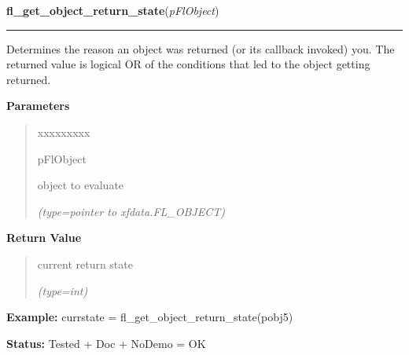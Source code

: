 \hspace{.8\funcindent}\begin{boxedminipage}{\funcwidth}

    \raggedright \textbf{fl\_get\_object\_return\_state}(\textit{pFlObject})

    \vspace{-1.5ex}

    \rule{\textwidth}{0.5\fboxrule}
\setlength{\parskip}{2ex}
    Determines the reason an object was returned (or its callback invoked) 
    you. The returned value is logical OR of the conditions that led to the
    object getting returned.

\setlength{\parskip}{1ex}
      \textbf{Parameters}
      \vspace{-1ex}

      \begin{quote}
        \begin{Ventry}{xxxxxxxxx}

          \item[pFlObject]

          object to evaluate

            {\it (type=pointer to xfdata.FL\_OBJECT)}

        \end{Ventry}

      \end{quote}

      \textbf{Return Value}
    \vspace{-1ex}

      \begin{quote}
      current return state

      {\it (type=int)}

      \end{quote}

\textbf{Example:} currstate = fl\_get\_object\_return\_state(pobj5)



\textbf{Status:} Tested + Doc + NoDemo = OK



    \end{boxedminipage}

    \label{xformslib:flbasic:fl_trigger_object}

    \vspace{0.5ex}

